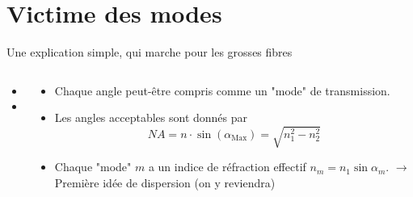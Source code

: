 \documentclass[aspectratio=149, 10pt, t]{beamer}
\begin{document}
\section{Victime des modes}

\begin{frame}{Une explication simple, qui marche pour les grosses fibres}
    \begin{columns}
    \begin{column}{0.5\linewidth}
            \begin{itemize}
                \item {}
                \item {}
            \end{itemize}
    \end{column}
    \begin{column}{0.5\linewidth}
        \begin{itemize}
            \item Chaque angle peut-être compris comme un "mode" de transmission.
            \item Les angles acceptables sont donnés par
            \begin{equation}
    N A=n \cdot \sin \left(\alpha_{\operatorname{Max}}\right)=\sqrt{n_{1}^{2}-n_{2}^{2}}
    \end{equation}
            \item Chaque "mode" $m$ a un indice de réfraction effectif $n_m=n_1\sin\alpha_m$. $\longrightarrow$ Première idée de dispersion (on y reviendra)
        \end{itemize}
    \end{column}
    \end{columns}
\end{frame}
\end{document}
